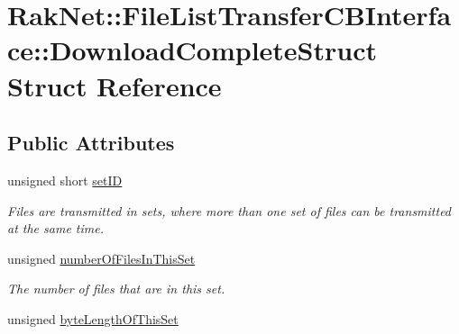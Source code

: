 \hypertarget{struct_rak_net_1_1_file_list_transfer_c_b_interface_1_1_download_complete_struct}{\section{Rak\-Net\-:\-:File\-List\-Transfer\-C\-B\-Interface\-:\-:Download\-Complete\-Struct Struct Reference}
\label{struct_rak_net_1_1_file_list_transfer_c_b_interface_1_1_download_complete_struct}
}
\subsection*{Public Attributes}
\begin{DoxyCompactItemize}
\item 
unsigned short \hyperlink{struct_rak_net_1_1_file_list_transfer_c_b_interface_1_1_download_complete_struct_a7f2f79cccc8890a5b17845384a58b548}{set\-I\-D}
\begin{DoxyCompactList}\small\item\em Files are transmitted in sets, where more than one set of files can be transmitted at the same time. \end{DoxyCompactList}\item 
\hypertarget{struct_rak_net_1_1_file_list_transfer_c_b_interface_1_1_download_complete_struct_af889c11ab469b97ef8da36f7dbeaeb92}{unsigned \hyperlink{struct_rak_net_1_1_file_list_transfer_c_b_interface_1_1_download_complete_struct_af889c11ab469b97ef8da36f7dbeaeb92}{number\-Of\-Files\-In\-This\-Set}}\label{struct_rak_net_1_1_file_list_transfer_c_b_interface_1_1_download_complete_struct_af889c11ab469b97ef8da36f7dbeaeb92}

\begin{DoxyCompactList}\small\item\em The number of files that are in this set. \end{DoxyCompactList}\item 
\hypertarget{struct_rak_net_1_1_file_list_transfer_c_b_interface_1_1_download_complete_struct_abaf41a1058b6182d1ac982d88a09470c}{unsigned \hyperlink{struct_rak_net_1_1_file_list_transfer_c_b_interface_1_1_download_complete_struct_abaf41a1058b6182d1ac982d88a09470c}{byte\-Length\-Of\-This\-Set}}\label{struct_rak_net_1_1_file_list_transfer_c_b_interface_1_1_download_complete_struct_abaf41a1058b6182d1ac982d88a09470c}


\end{DoxyCompactItemize}
